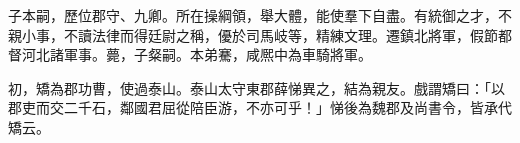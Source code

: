 \begin{pinyinscope}
 
子本嗣，歷位郡守、九卿。所在操綱領，舉大體，能使羣下自盡。有統御之才，不親小事，不讀法律而得廷尉之稱，優於司馬岐等，精練文理。遷鎮北將軍，假節都督河北諸軍事。薨，子粲嗣。本弟騫，咸熈中為車騎將軍。
 
 
初，矯為郡功曹，使過泰山。泰山太守東郡薛悌異之，結為親友。戲謂矯曰：「以郡吏而交二千石，鄰國君屈從陪臣游，不亦可乎！」悌後為魏郡及尚書令，皆承代矯云。
 
 
\end{pinyinscope}